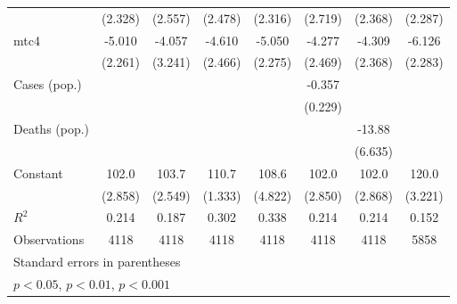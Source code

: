 \documentclass{article}
\begin{document}
{\begin{longtable}{l*{7}{c}}
                &  (2.328)         &  (2.557)         &  (2.478)         &  (2.316)         &  (2.719)         &  (2.368)         &  (2.287)         \\
mtc4            &   -5.010\sym{*}  &   -4.057         &   -4.610         &   -5.050\sym{*}  &   -4.277         &   -4.309         &   -6.126\sym{*}  \\
                &  (2.261)         &  (3.241)         &  (2.466)         &  (2.275)         &  (2.469)         &  (2.368)         &  (2.283)         \\
Cases (pop.)    &                  &                  &                  &                  &   -0.357         &                  &                  \\
                &                  &                  &                  &                  &  (0.229)         &                  &                  \\
Deaths (pop.)   &                  &                  &                  &                  &                  &   -13.88\sym{*}  &                  \\
                &                  &                  &                  &                  &                  &  (6.635)         &                  \\
Constant        &    102.0\sym{***}&    103.7\sym{***}&    110.7\sym{***}&    108.6\sym{***}&    102.0\sym{***}&    102.0\sym{***}&    120.0\sym{***}\\
                &  (2.858)         &  (2.549)         &  (1.333)         &  (4.822)         &  (2.850)         &  (2.868)         &  (3.221)         \\
\hline
\(R^{2}\)       &    0.214         &    0.187         &    0.302         &    0.338         &    0.214         &    0.214         &    0.152         \\
Observations    &     4118         &     4118         &     4118         &     4118         &     4118         &     4118         &     5858         \\
\hline\hline
\multicolumn{8}{l}{\footnotesize Standard errors in parentheses}\\
\multicolumn{8}{l}{\footnotesize \sym{*} \(p<0.05\), \sym{**} \(p<0.01\), \sym{***} \(p<0.001\)}\\
\end{longtable}
}
\end{document}
